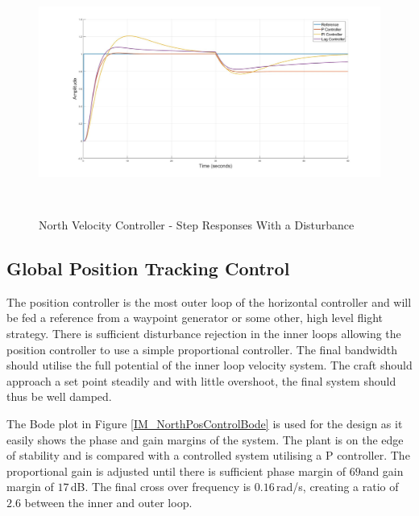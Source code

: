 \documentclass[12pt]{report}
\begin{document}
\begin{figure}[H]
	\centering
	\includegraphics[height = 8cm]{../Design/Matlab/Controllers/north_velocity_stepd.jpg}
	\caption{North Velocity Controller -  Step Responses With a Disturbance}
	\label{IM_NorthVelControlDistStep}
\end{figure}	

\subsection{Global Position Tracking Control}
The position controller is the most outer loop of the horizontal controller and will be fed a reference from a waypoint generator or some other, high level flight strategy. There is sufficient disturbance rejection in the inner loops allowing the position controller to use a simple proportional controller. The final bandwidth should utilise the full potential of the inner loop velocity system. The craft should approach a set point steadily and with little overshoot, the final system should thus be well damped.

The Bode plot in Figure \ref{IM_NorthPosControlBode} is used for the design as it easily shows the phase and gain margins of the system. The plant is on the edge of stability and is compared with a controlled system utilising a P controller. The proportional gain is adjusted until there is sufficient phase margin of $69$\textdegree and gain margin of $17$\,dB. The final cross over frequency is $0.16$\,rad/s, creating a ratio of $2.6$ between the inner and outer loop.
\end{document}
